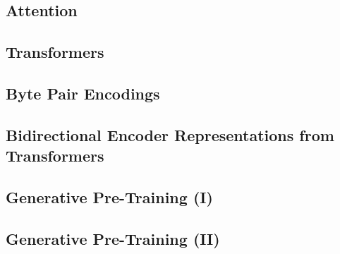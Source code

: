 \subsection{Attention}\label{sec:language-models:attention}
\subsection{Transformers}\label{sec:language-models:transformers}
\subsection{Byte Pair Encodings}\label{sec:language-models:bpe}
\subsection{Bidirectional Encoder Representations from Transformers}\label{sec:language-models:bert}
\subsection{Generative Pre-Training (I)}\label{sec:language-models:gpt}
\subsection{Generative Pre-Training (II)}\label{sec:language-models:gpt-2}

